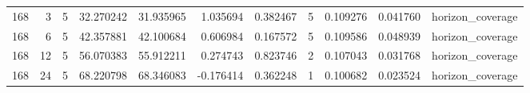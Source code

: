 \begin{table}
\begin{tabular}{rrrrrrrrrrl}
168 & 3 & 5 & 32.270242 & 31.935965 & 1.035694 & 0.382467 & 5 & 0.109276 & 0.041760 & horizon\_coverage \\
168 & 6 & 5 & 42.357881 & 42.100684 & 0.606984 & 0.167572 & 5 & 0.109586 & 0.048939 & horizon\_coverage \\
168 & 12 & 5 & 56.070383 & 55.912211 & 0.274743 & 0.823746 & 2 & 0.107043 & 0.031768 & horizon\_coverage \\
168 & 24 & 5 & 68.220798 & 68.346083 & -0.176414 & 0.362248 & 1 & 0.100682 & 0.023524 & horizon\_coverage \\
\bottomrule
\end{tabular}
\end{table}
